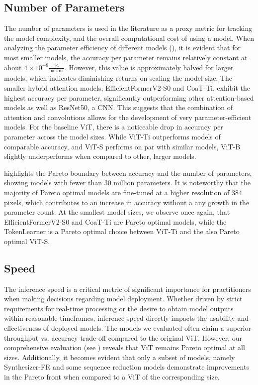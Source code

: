 \subsection{Number of Parameters}
The number of parameters 
is
used in the literature as a proxy metric for tracking the model complexity, and the overall computational cost of using a model.
When analyzing the parameter efficiency of different models (), it is evident that for most smaller models, the accuracy per parameter remains relatively constant at about $4 \times 10^{-8} \frac{\%}{\text{param.}}$. 
However, this value is approximately halved for larger models, which indicates diminishing returns on scaling the model size.
The smaller hybrid attention models, EfficientFormerV2-S0 and CoaT-Ti, exhibit the highest accuracy per parameter,
significantly outperforming
other attention-based models as well as ResNet50, a CNN. This 
suggests that the combination of attention and convolutions allows for the development of 
very parameter-efficient models.
For
the baseline ViT, there is a noticeable drop in accuracy per parameter across 
the
model sizes. While ViT-Ti 
outperforms
models of comparable accuracy, and ViT-S performs on par with similar models, ViT-B slightly underperforms when compared to other, larger models. 

 highlights the Pareto boundary between accuracy and the number of parameters, showing models with fewer than $30$ million parameters.
It is noteworthy that the majority of Pareto optimal models are fine-tuned at a higher resolution of $384$ pixels, which contributes to an increase in accuracy without a any growth in the parameter count. 
At the smallest model sizes, we observe once again, that EfficientFormerV2-S0 and CoaT-Ti are Pareto optimal models,
while the TokenLearner is a Pareto optimal choice between ViT-Ti and the also Pareto optimal ViT-S.


\subsection{Speed}
The inference speed is a critical metric of significant importance for practitioners when making decisions regarding model deployment. 
Whether driven by strict requirements for real-time processing 
or the desire to obtain model outputs within reasonable timeframes, inference speed directly impacts the usability and effectiveness of deployed models. 
The models we evaluated often claim a superior 
throughput vs. accuracy trade-off
compared to the original ViT. 
However, our comprehensive evaluation (see ) reveals that ViT remains Pareto optimal at all sizes.
Additionally, it becomes evident that only a subset of models, namely Synthesizer-FR and 
some sequence reduction models
demonstrate improvements in the Pareto front when compared to a ViT of the corresponding size.


